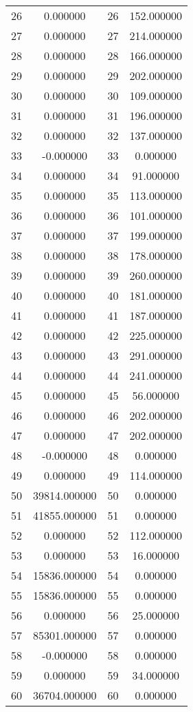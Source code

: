\documentclass[12pt]{article}
\begin{document}
\begin{longtable}{@{}cccc@{}}
26 & 0.000000 & 26 & 152.000000 \\
27 & 0.000000 & 27 & 214.000000 \\
28 & 0.000000 & 28 & 166.000000 \\
29 & 0.000000 & 29 & 202.000000 \\
30 & 0.000000 & 30 & 109.000000 \\
31 & 0.000000 & 31 & 196.000000 \\
32 & 0.000000 & 32 & 137.000000 \\
33 & -0.000000 & 33 & 0.000000 \\
34 & 0.000000 & 34 & 91.000000 \\
35 & 0.000000 & 35 & 113.000000 \\
36 & 0.000000 & 36 & 101.000000 \\
37 & 0.000000 & 37 & 199.000000 \\
38 & 0.000000 & 38 & 178.000000 \\
39 & 0.000000 & 39 & 260.000000 \\
40 & 0.000000 & 40 & 181.000000 \\
41 & 0.000000 & 41 & 187.000000 \\
42 & 0.000000 & 42 & 225.000000 \\
43 & 0.000000 & 43 & 291.000000 \\
44 & 0.000000 & 44 & 241.000000 \\
45 & 0.000000 & 45 & 56.000000 \\
46 & 0.000000 & 46 & 202.000000 \\
47 & 0.000000 & 47 & 202.000000 \\
48 & -0.000000 & 48 & 0.000000 \\
49 & 0.000000 & 49 & 114.000000 \\
50 & 39814.000000 & 50 & 0.000000 \\
51 & 41855.000000 & 51 & 0.000000 \\
52 & 0.000000 & 52 & 112.000000 \\
53 & 0.000000 & 53 & 16.000000 \\
54 & 15836.000000 & 54 & 0.000000 \\
55 & 15836.000000 & 55 & 0.000000 \\
56 & 0.000000 & 56 & 25.000000 \\
57 & 85301.000000 & 57 & 0.000000 \\
58 & -0.000000 & 58 & 0.000000 \\
59 & 0.000000 & 59 & 34.000000 \\
60 & 36704.000000 & 60 & 0.000000 \\

\end{longtable}
\end{document}
